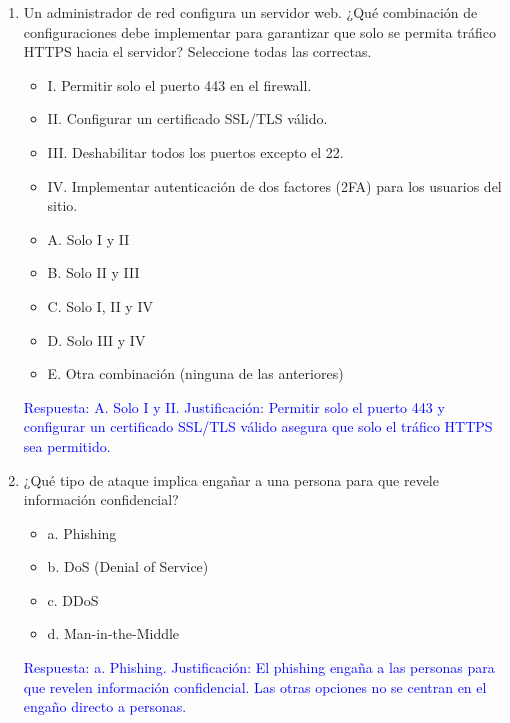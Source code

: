 \documentclass[a4paper]{article}
\begin{document}
\begin{enumerate}
    \item Un administrador de red configura un servidor web. ¿Qué combinación de configuraciones debe implementar para garantizar que solo se permita tráfico HTTPS hacia el servidor? Seleccione todas las correctas.
    \begin{itemize}
        \item I. Permitir solo el puerto 443 en el firewall.
        \item II. Configurar un certificado SSL/TLS válido.
        \item III. Deshabilitar todos los puertos excepto el 22.
        \item IV. Implementar autenticación de dos factores (2FA) para los usuarios del sitio.
    \end{itemize}
    \begin{itemize}
        \item A. Solo I y II
        \item B. Solo II y III
        \item C. Solo I, II y IV
        \item D. Solo III y IV
        \item E. Otra combinación (ninguna de las anteriores)
    \end{itemize}
    \textcolor{blue}{Respuesta: A. Solo I y II. Justificación: Permitir solo el puerto 443 y configurar un certificado SSL/TLS válido asegura que solo el tráfico HTTPS sea permitido.}
    \vspace{1cm}

    \item ¿Qué tipo de ataque implica engañar a una persona para que revele información confidencial?
    \begin{itemize}
        \item a. Phishing
        \item b. DoS (Denial of Service)
        \item c. DDoS
        \item d. Man-in-the-Middle
    \end{itemize}
    \textcolor{blue}{Respuesta: a. Phishing. Justificación: El phishing engaña a las personas para que revelen información confidencial. Las otras opciones no se centran en el engaño directo a personas.}
    \vspace{1cm}


\end{enumerate}
\end{document}
